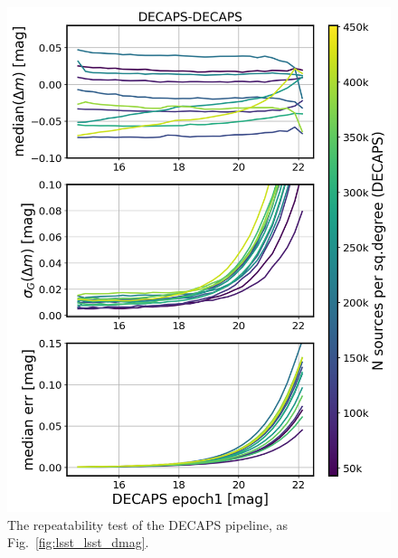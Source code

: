 \documentclass[DM,lsstdraft,toc,usenatbib,authoryear]{lsstdoc}
\begin{document}
\begin{figure}
\begin{centering}
\includegraphics[width=0.8\columnwidth]{figs/decaps-decaps_rms_plot.png}
\caption{The repeatability test of the DECAPS pipeline, as Fig.~\ref{fig:lsst_lsst_dmag}.}
\label{fig:decaps_decaps_dmag}
\end{centering}
\end{figure}
\end{document}
